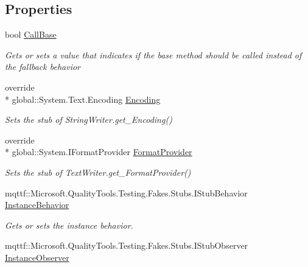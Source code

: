 \subsection*{Properties}
\begin{DoxyCompactItemize}
\item 
bool \hyperlink{class_system_1_1_i_o_1_1_fakes_1_1_stub_string_writer_a1358a2012cdbf029346bd3818e264942}{Call\-Base}
\begin{DoxyCompactList}\small\item\em Gets or sets a value that indicates if the base method should be called instead of the fallback behavior\end{DoxyCompactList}\item 
override \\*
global\-::\-System.\-Text.\-Encoding \hyperlink{class_system_1_1_i_o_1_1_fakes_1_1_stub_string_writer_acad4d2552ad82f0c3214c631bd733233}{Encoding}
\begin{DoxyCompactList}\small\item\em Sets the stub of String\-Writer.\-get\-\_\-\-Encoding()\end{DoxyCompactList}\item 
override \\*
global\-::\-System.\-I\-Format\-Provider \hyperlink{class_system_1_1_i_o_1_1_fakes_1_1_stub_string_writer_ab1e6624f6e683df43626579b426a6696}{Format\-Provider}
\begin{DoxyCompactList}\small\item\em Sets the stub of Text\-Writer.\-get\-\_\-\-Format\-Provider()\end{DoxyCompactList}\item 
mqttf\-::\-Microsoft.\-Quality\-Tools.\-Testing.\-Fakes.\-Stubs.\-I\-Stub\-Behavior \hyperlink{class_system_1_1_i_o_1_1_fakes_1_1_stub_string_writer_a88bc77e70b4498c5f955aeb62c8feac5}{Instance\-Behavior}
\begin{DoxyCompactList}\small\item\em Gets or sets the instance behavior.\end{DoxyCompactList}\item 
mqttf\-::\-Microsoft.\-Quality\-Tools.\-Testing.\-Fakes.\-Stubs.\-I\-Stub\-Observer \hyperlink{class_system_1_1_i_o_1_1_fakes_1_1_stub_string_writer_a07f440f09c32cb60ce01a8f9f4ac59f0}{Instance\-Observer}

\end{DoxyCompactItemize}
